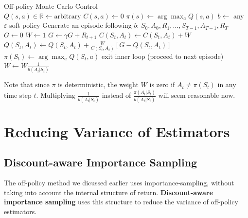 \documentclass[../../main.tex]{subfiles}
\begin{document}
        {Off-policy Monte Carlo Control}
        {}
        { \\
        }
        {
            {
                $Q(s,a) \in \mathbb{R} \leftarrow \text{arbitrary}$\;
                $C(s,a) \leftarrow 0$\;
                $\pi(s) \leftarrow \arg\max_a Q(s,a)$\;
            }
            {
                $b \leftarrow$ any $\varepsilon$-soft policy\;
                Generate an episode following $b$: $S_0, A_0, R_1, \dots, S_{T-1}, A_{T-1}, R_T$\;
                $G \leftarrow 0$\;
                $W \leftarrow 1$\;
                {
                    $G \leftarrow \gamma G + R_{t+1}$\;
                    $C(S_t,A_t) \leftarrow C(S_t,A_t) + W$\;
                    $Q(S_t,A_t) \leftarrow Q(S_t,A_t) + \frac{W}{C(S_t,A_t)}[G - Q(S_t,A_t)]$\;
                    $\pi(S_t) \leftarrow \arg\max_a Q(S_t,a)$\;
                    {
                        exit inner loop (proceed to next episode)\;
                    }
                    $W \leftarrow W \frac{1}{b(A_t|S_t)}$\;
                }
            }
        }

        Note that since $\pi$ is deterministic, the weight $W$ is zero if $A_t \neq \pi(S_t)$ in any time step $t$.
        Multiplying $\frac{1}{b(A_t|S_t)}$ instead of $\frac{\pi(A_t|S_t)}{b(A_t|S_t)}$ will seem reasonable now.

\section{Reducing Variance of Estimators}
    \subsection{Discount-aware Importance Sampling}
        The off-policy method we dicussed earlier uses importance-sampling, without taking into account the internal structure of
        return. \textbf{Discount-aware importance sampling} uses this structure to reduce the variance of off-policy estimators.
\end{document}
